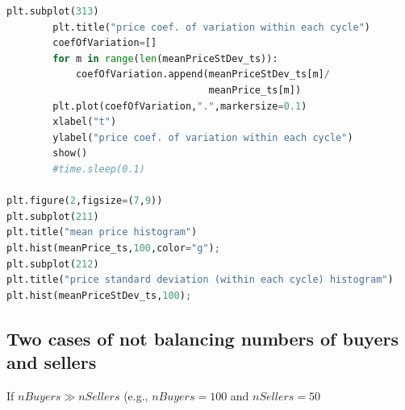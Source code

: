 \documentclass[12pt]{report}
\begin{document}
\begin{lstlisting}[language=Python, caption=The unstructured version, basicstyle=\ttfamily\footnotesize]
        plt.subplot(313)
        plt.title("price coef. of variation within each cycle")
        coefOfVariation=[]
        for m in range(len(meanPriceStDev_ts)):
            coefOfVariation.append(meanPriceStDev_ts[m]/
                                   meanPrice_ts[m])
        plt.plot(coefOfVariation,".",markersize=0.1)
        xlabel("t")
        ylabel("price coef. of variation within each cycle")
        show()
        #time.sleep(0.1)

plt.figure(2,figsize=(7,9))
plt.subplot(211)
plt.title("mean price histogram")
plt.hist(meanPrice_ts,100,color="g");
plt.subplot(212)
plt.title("price standard deviation (within each cycle) histogram")
plt.hist(meanPriceStDev_ts,100);
\end{lstlisting}




\begin{appendices}
\section{Two cases of not balancing numbers of buyers and sellers}\label{Two cases of not balancing numbers of buyers and sellers}
\thispagestyle{fancy}

If $nBuyers \gg nSellers$ (e.g., $nBuyers=100$ and $nSellers=50$

\end{appendices}

\clearpage
{}




\clearpage
{}
\printindex
\end{document}
